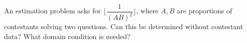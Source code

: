 An estimation problem asks for $\lfloor\dfrac{1}{(AB)^2}\rfloor$, where $A,B$ are proportions of contestants solving two questions. Can this be determined without contestant data? What domain condition is needed?
